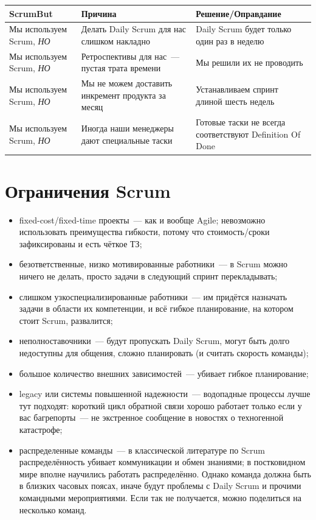 \documentclass{../../text-style}
\begin{document}
\begin{center}
    \begin{tabularx}{\textwidth} { 
        | >{\centering\arraybackslash}X 
        | >{\centering\arraybackslash}X 
        | >{\centering\arraybackslash}X | }
        \hline
        ScrumBut                       & Причина                                           & Решение/Оправдание \\
        \hline
        Мы используем Scrum, \emph{НО} & Делать Daily Scrum для нас слишком накладно       & Daily Scrum будет только один раз в неделю               \\
        \hline
        Мы используем Scrum, \emph{НО} & Ретроспективы для нас~--- пустая трата времени    & Мы решили их не проводить                                \\
        \hline
        Мы используем Scrum, \emph{НО} & Мы не можем доставить инкремент продукта за месяц & Устанавливаем спринт длиной шесть недель                 \\
        \hline
        Мы используем Scrum, \emph{НО} & Иногда наши менеджеры дают специальные таски      & Готовые таски не всегда соответствуют Definition Of Done \\
        \hline
    \end{tabularx}
\end{center}

\section{Ограничения Scrum}

\begin{itemize}
    \item fixed-cost/fixed-time проекты~--- как и вообще Agile; невозможно использовать преимущества гибкости, потому что стоимость/сроки зафиксированы и есть чёткое ТЗ;
    \item безответственные, низко мотивированные работники~--- в Scrum можно ничего не делать, просто задачи в следующий спринт перекладывать;
    \item слишком узкоспециализированные работники~--- им придётся назначать задачи в области их компетенции, и всё гибкое планирование, на котором стоит Scrum, развалится;
    \item неполноставочники~--- будут пропускать Daily Scrum, могут быть долго недоступны для общения, сложно планировать (и считать скорость команды);
    \item большое количество внешних зависимостей~--- убивает гибкое планирование;
    \item legacy или системы повышенной надежности~--- водопадные процессы лучше тут подходят: короткий цикл обратной связи хорошо работает только если у вас багрепорты~--- не экстренное сообщение в новостях о техногенной катастрофе;
    \item распределенные команды~--- в классической литературе по Scrum распределённость убивает коммуникации и обмен знаниями; в постковидном мире вполне научились работать распределённо. Однако команда должна быть в близких часовых поясах, иначе будут проблемы с Daily Scrum и прочими командными мероприятиями. Если так не получается, можно поделиться на несколько команд.
\end{itemize}
\end{document}
